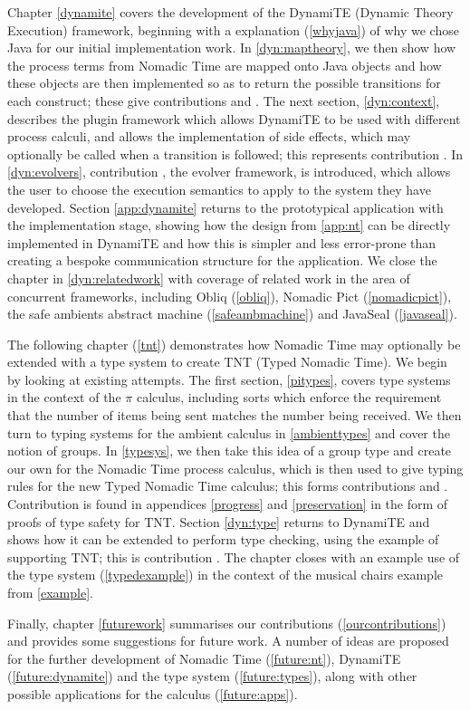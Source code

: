 Chapter \ref{dynamite} covers the development of the DynamiTE (Dynamic
Theory Execution) framework, beginning with a explanation
(\ref{whyjava}) of why we chose Java for our initial implementation
work.  In \ref{dyn:maptheory}, we then show how the process terms from
Nomadic Time are mapped onto Java objects and how these objects are
then implemented so as to return the possible transitions for each
construct; these give contributions  and .  The
next section, \ref{dyn:context}, describes the plugin framework which
allows DynamiTE to be used with different process calculi, and allows
the implementation of side effects, which may optionally be called
when a transition is followed; this represents contribution
.  In \ref{dyn:evolvers}, contribution , the
evolver framework, is introduced, which allows the user to choose the
execution semantics to apply to the system they have developed.
Section \ref{app:dynamite} returns to the prototypical application
with the implementation stage, showing how the design from
\ref{app:nt} can be directly implemented in DynamiTE and how this is
simpler and less error-prone than creating a bespoke communication
structure for the application.  We close the chapter in
\ref{dyn:relatedwork} with coverage of related work in the area of
concurrent frameworks, including Obliq \cite{obliq} (\ref{obliq}),
Nomadic Pict \cite{wojciechowski:phd} (\ref{nomadicpict}), the safe
ambients abstract machine \cite{sangiorgi:safeambientsmachine}
(\ref{safeambmachine}) and JavaSeal \cite{javaseal} (\ref{javaseal}).

The following chapter (\ref{tnt}) demonstrates how Nomadic Time may
optionally be extended with a type system to create TNT (Typed Nomadic
Time).  We begin by looking at existing attempts. The first section,
\ref{pitypes}, covers type systems in the context of the $\pi$
calculus, including sorts which enforce the requirement that the
number of items being sent matches the number being received.  We then
turn to typing systems for the ambient calculus in \ref{ambienttypes}
and cover the notion of groups.  In \ref{typesys}, we then take this
idea of a group type and create our own for the Nomadic Time process
calculus, which is then used to give typing rules for the new Typed
Nomadic Time calculus; this forms contributions  and
.  Contribution  is found in appendices
\ref{progress} and \ref{preservation} in the form of proofs of type
safety for TNT.  Section \ref{dyn:type} returns to DynamiTE and shows
how it can be extended to perform type checking, using the example of
supporting TNT; this is contribution .  The chapter closes
with an example use of the type system (\ref{typedexample}) in the
context of the musical chairs example from \ref{example}.

Finally, chapter \ref{futurework} summarises our contributions
(\ref{ourcontributions}) and provides some suggestions for future
work.  A number of ideas are proposed for the further development of
Nomadic Time (\ref{future:nt}), DynamiTE (\ref{future:dynamite}) and
the type system (\ref{future:types}), along with other possible
applications for the calculus (\ref{future:apps}).

